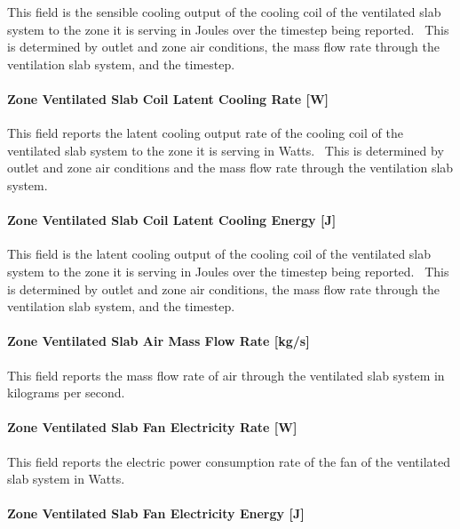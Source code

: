 This field is the sensible cooling output of the cooling coil of the ventilated slab system to the zone it is serving in Joules over the timestep being reported.~ This is determined by outlet and zone air conditions, the mass flow rate through the ventilation slab system, and the timestep.

\paragraph{Zone Ventilated Slab Coil Latent Cooling Rate {[}W{]}}\label{zone-ventilated-slab-coil-latent-cooling-rate-w}

This field reports the latent cooling output rate of the cooling coil of the ventilated slab system to the zone it is serving in Watts.~ This is determined by outlet and zone air conditions and the mass flow rate through the ventilation slab system.

\paragraph{Zone Ventilated Slab Coil Latent Cooling Energy {[}J{]}}\label{zone-ventilated-slab-coil-latent-cooling-energy-j}

This field is the latent cooling output of the cooling coil of the ventilated slab system to the zone it is serving in Joules over the timestep being reported.~ This is determined by outlet and zone air conditions, the mass flow rate through the ventilation slab system, and the timestep.

\paragraph{Zone Ventilated Slab Air Mass Flow Rate {[}kg/s{]}}\label{zone-ventilated-slab-air-mass-flow-rate-kgs}

This field reports the mass flow rate of air through the ventilated slab system in kilograms per second.

\paragraph{Zone Ventilated Slab Fan Electricity Rate {[}W{]}}\label{zone-ventilated-slab-fan-electric-power-w}

This field reports the electric power consumption rate of the fan of the ventilated slab system in Watts.

\paragraph{Zone Ventilated Slab Fan Electricity Energy {[}J{]}}\label{zone-ventilated-slab-fan-electric-energy-j}

